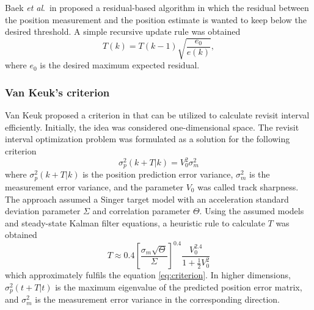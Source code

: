 \documentclass[11pt,a4paper]{article}
\newcommand{\etal}{\textit{et al}.~}
\begin{document}
Baek \etal in \cite{Baek2010} proposed a residual-based algorithm in which the residual between the position measurement and the position estimate is wanted to keep below the desired threshold.
A simple recursive update rule was obtained
\begin{equation}
    T(k) = T(k - 1) \sqrt{\frac{e_0}{e(k)}},
\end{equation}
where $e_0$ is the desired maximum expected residual.

\subsubsection{Van Keuk's criterion}

Van Keuk proposed a criterion in \cite{Keuk1975} that can be utilized to calculate revisit interval efficiently.
Initially, the idea was considered one-dimensional space.
The revisit interval optimization problem was formulated as a solution for the following criterion
\begin{equation} \label{eq:criterion}
    \sigma_p^2(k + T | k) = V_0^2 \sigma_m^2
\end{equation}
where $\sigma_p^2(k + T | k)$ is the position prediction error variance, $\sigma_m^2$ is the measurement error variance, and
the parameter $V_0$ was called track sharpness.
The approach assumed a Singer target model with an acceleration standard deviation parameter $\Sigma$ and correlation parameter $\Theta$.
Using the assumed models and steady-state Kalman filter equations, a heuristic rule to calculate $T$ was obtained
\begin{equation}\label{eq:keuk_time}
    T \approx 0.4 \left[ \frac{\sigma_m \sqrt{\Theta}}{\Sigma} \right]^{0.4} \frac{V_0^{2.4}}{1+\frac{1}{2}V_0^2}
\end{equation}
which approximately fulfils the equation \eqref{eq:criterion}.
In higher dimensions, $\sigma_p^2(t + T | t)$ is the maximum eigenvalue of the predicted position error matrix, and $\sigma_m^2$ is the measurement error variance in the corresponding direction.
\end{document}
